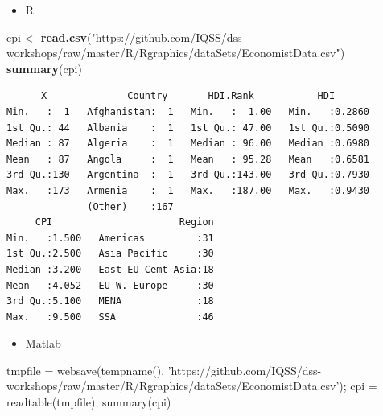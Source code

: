 \documentclass[]{book}
\newenvironment{Shaded}{\begin{snugshade}}{\end{snugshade}}
\newcommand{\KeywordTok}[1]{\textcolor[rgb]{0.13,0.29,0.53}{\textbf{#1}}}
\newcommand{\NormalTok}[1]{#1}
\newcommand{\StringTok}[1]{\textcolor[rgb]{0.31,0.60,0.02}{#1}}
\providecommand{\tightlist}{%
  \setlength{\itemsep}{0pt}\setlength{\parskip}{0pt}}
\begin{document}
\begin{itemize}
\tightlist
\item
  R
\end{itemize}

\begin{Shaded}
\begin{Highlighting}[]
\NormalTok{cpi <-}\StringTok{ }\KeywordTok{read.csv}\NormalTok{(}\StringTok{"https://github.com/IQSS/dss-workshops/raw/master/R/Rgraphics/dataSets/EconomistData.csv"}\NormalTok{)}
\KeywordTok{summary}\NormalTok{(cpi)}
\end{Highlighting}
\end{Shaded}

\begin{verbatim}
      X              Country       HDI.Rank           HDI        
Min.   :  1   Afghanistan:  1   Min.   :  1.00   Min.   :0.2860  
1st Qu.: 44   Albania    :  1   1st Qu.: 47.00   1st Qu.:0.5090  
Median : 87   Algeria    :  1   Median : 96.00   Median :0.6980  
Mean   : 87   Angola     :  1   Mean   : 95.28   Mean   :0.6581  
3rd Qu.:130   Argentina  :  1   3rd Qu.:143.00   3rd Qu.:0.7930  
Max.   :173   Armenia    :  1   Max.   :187.00   Max.   :0.9430  
              (Other)    :167                                    
     CPI                      Region  
Min.   :1.500   Americas         :31  
1st Qu.:2.500   Asia Pacific     :30  
Median :3.200   East EU Cemt Asia:18  
Mean   :4.052   EU W. Europe     :30  
3rd Qu.:5.100   MENA             :18  
Max.   :9.500   SSA              :46
\end{verbatim}

\begin{itemize}
\tightlist
\item
  Matlab
\end{itemize}

\begin{Shaded}
\begin{Highlighting}[]
\NormalTok{tmpfile = websave(tempname(), }\StringTok{'https://github.com/IQSS/dss-workshops/raw/master/R/Rgraphics/dataSets/EconomistData.csv'}\NormalTok{);}
\NormalTok{cpi = readtable(tmpfile);}
\NormalTok{summary(cpi)}
\end{Highlighting}
\end{Shaded}
\end{document}

